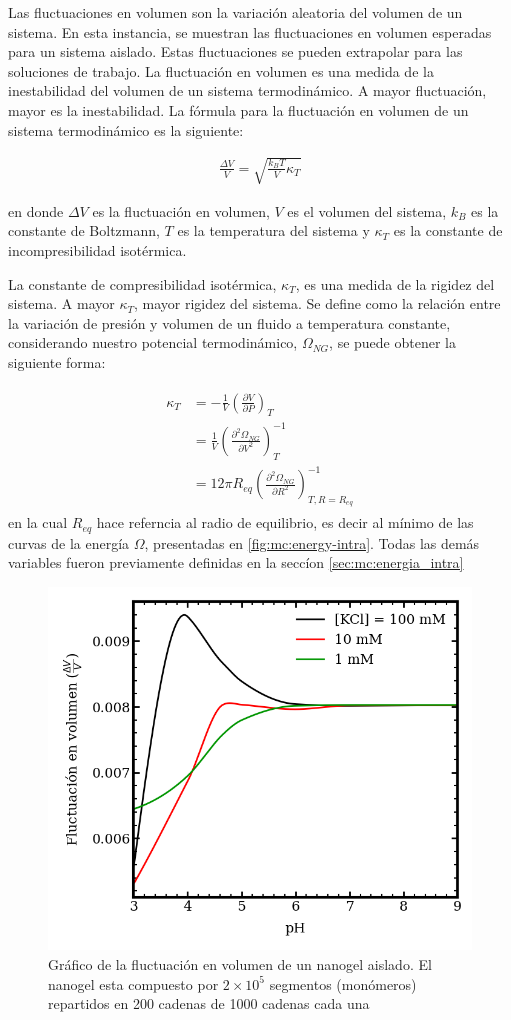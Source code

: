 	Las fluctuaciones en volumen son la variaci\'on aleatoria del volumen de un sistema. En esta instancia, se muestran las fluctuaciones en volumen esperadas para un sistema aislado. Estas fluctuaciones se pueden extrapolar para las soluciones de trabajo.
	La fluctuaci\'on en volumen es una medida de la inestabilidad del volumen de un sistema termodin\'amico. A mayor fluctuaci\'on, mayor es la inestabilidad.
	La f\'ormula para la fluctuaci\'on en volumen de un sistema termodin\'amico es la siguiente:
	
	\begin{align}
		\frac{\Delta V}{V} = \sqrt{\frac{k_BT}{V}\kappa_T}
	\end{align}
	
	\noindent en donde $\Delta V$ es la fluctuaci\'on en volumen, $V$ es el volumen del sistema, $k_B$ es la constante de Boltzmann, $T$ es la temperatura del sistema y $\kappa_T$ es la constante de incompresibilidad isot\'ermica. 
	
	La constante de compresibilidad isot\'ermica, $\kappa_T$, es una medida de la rigidez del sistema. A mayor $\kappa_T$, mayor rigidez del sistema.
	Se define como la relación entre la variaci\'on de presi\'on y  volumen de un fluido a temperatura constante, considerando nuestro potencial termodin\'amico, $\Omega_{NG}$, se puede obtener la siguiente forma:
	
	
	\begin{align}
		\begin{aligned}
			\kappa_T & = -\frac{1}{V} \left( \frac{\partial V}{\partial P}\right)_T \\
			& =\frac{1}{V} \left( \frac{\partial^2 \Omega_{NG}}{\partial V^2}\right)^{-1}_T \\
			& = 12 \pi R_{eq} \left( \frac{\partial^2 \Omega_{NG}}{\partial R^2}\right)^{-1}_{T,R=R_{eq}}
		\end{aligned}
	\end{align}
	\noindent en la cual $R_{eq}$ hace referncia al radio de equilibrio, es decir al m\'inimo de las curvas de la energ\'ia $ \Omega$, presentadas en \ref{fig:mc:energy-intra}. Todas las dem\'as variables fueron previamente definidas en la secc\'ion \ref{sec:mc:energia_intra}
	
	\begin{figure}
		\centering
		\includegraphics[width=0.45\linewidth]{Figures/graph-mc/fluct-pH.png}
		\caption{Gr\'afico de la fluctuaci\'on en volumen de un nanogel aislado. El nanogel esta compuesto por $2\times 10^5$ segmentos (mon\'omeros) repartidos en 200 cadenas de 1000 cadenas cada una}
		\label{fig:mc:flut-pH}
	\end{figure}
	
